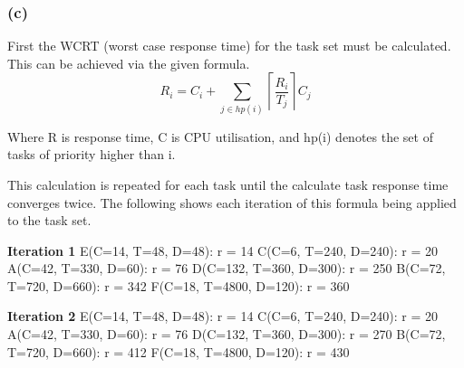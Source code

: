 \documentclass[]{report}
\begin{document}
			
			
			
			\subsubsection{(c)}
			First the WCRT (worst case response time) for the task set must be calculated. This can be achieved via the given formula.
			\begin{equation}
			R_i = C_i + \sum_{j \in hp(i)} \left\lceil \frac{R_i}{T_j} \right\rceil C_j
			\end{equation}
			
			Where R is response time, C is CPU utilisation, and hp(i) denotes the set of tasks of priority higher than i.

			This calculation is repeated for each task until the calculate task response time converges twice. The following shows each iteration of this formula being applied to the task set.
			\medskip

			\textbf{Iteration 1} \newline
			E(C=14, T=48, D=48): r = 14 \newline
			C(C=6, T=240, D=240): r = 20 \newline
			A(C=42, T=330, D=60): r = 76 \newline
			D(C=132, T=360, D=300): r = 250 \newline
			B(C=72, T=720, D=660): r = 342 \newline
			F(C=18, T=4800, D=120): r = 360 \newline
	
			\textbf{Iteration 2} \newline
			E(C=14, T=48, D=48): r = 14 \newline
			C(C=6, T=240, D=240): r = 20 \newline
			A(C=42, T=330, D=60): r = 76 \newline
			D(C=132, T=360, D=300): r = 270 \newline
			B(C=72, T=720, D=660): r = 412 \newline
			F(C=18, T=4800, D=120): r = 430 \newline
	
\end{document}
